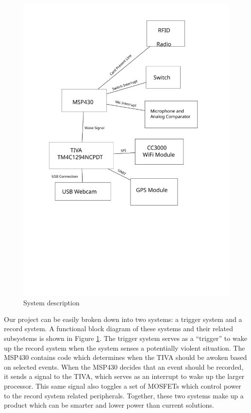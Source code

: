 \documentclass[12pt]{article}
\begin{document}
\begin{figure}[h]
    \centering
    \includegraphics[height=0.5\textheight]{sys_desc}
    \caption{System description}
    \label{fig:system_description}
\end{figure}

Our project can be easily broken down into two systems: a trigger system and a
record system. A functional block diagram of these systems and their related
subsystems is shown in Figure \ref{fig:system_description}. The trigger system
serves as a ``trigger'' to wake up the record system when the system senses a
potentially violent situation. The MSP430 contains code which determines when
the TIVA should be awoken based on selected events. When the MSP430 decides
that an event should be recorded, it sends a signal to the TIVA, which serves
as an interrupt to wake up the larger processor. This same signal also toggles
a set of MOSFETs which control power to the record system related peripherals.
Together, these two systems make up a product which can be smarter and lower
power than current solutions.
\end{document}
